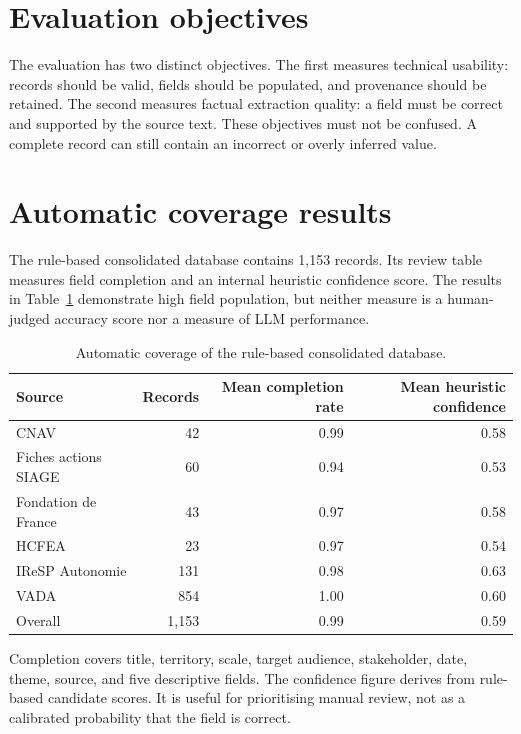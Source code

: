 \section{Evaluation objectives}

The evaluation has two distinct objectives. The first measures technical
usability: records should be valid, fields should be populated, and provenance
should be retained. The second measures factual extraction quality: a field must
be correct and supported by the source text. These objectives must not be
confused. A complete record can still contain an incorrect or overly inferred
value.

\section{Automatic coverage results}

The rule-based consolidated database contains 1,153 records. Its review table
measures field completion and an internal heuristic confidence score. The
results in Table~\ref{tab:coverage-results} demonstrate high field population,
but neither measure is a human-judged accuracy score nor a measure of LLM
performance.

\begin{table}[H]
\centering
\begin{tabular}{lrrr}
\toprule
Source & Records & Mean completion rate & Mean heuristic confidence \\
\midrule
CNAV & 42 & 0.99 & 0.58 \\
Fiches actions SIAGE & 60 & 0.94 & 0.53 \\
Fondation de France & 43 & 0.97 & 0.58 \\
HCFEA & 23 & 0.97 & 0.54 \\
IReSP Autonomie & 131 & 0.98 & 0.63 \\
VADA & 854 & 1.00 & 0.60 \\
\midrule
Overall & 1,153 & 0.99 & 0.59 \\
\bottomrule
\end{tabular}
\caption{Automatic coverage of the rule-based consolidated database.}
\label{tab:coverage-results}
\end{table}

Completion covers title, territory, scale, target audience, stakeholder, date,
theme, source, and five descriptive fields. The confidence figure derives from
rule-based candidate scores. It is useful for prioritising manual review, not as
a calibrated probability that the field is correct.

